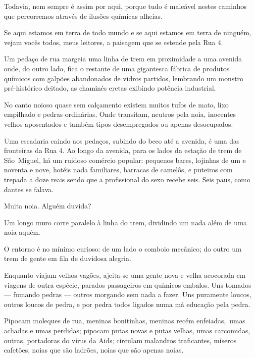 Todavia, nem sempre é assim por aqui, porque tudo é maleável nestes
caminhos que percorremos através de ilusões químicas alheias.

\asterisc{}

Se aqui estamos em terra de todo mundo e se aqui estamos em terra de
ninguém, vejam vocês todos, meus leitores, a paisagem que se estende
pela Rua 4.

Um pedaço de rua margeia uma linha de trem em proximidade a uma avenida
onde, do outro lado, fica o restante de uma gigantesca fábrica de
produtos químicos com galpões abandonados de vidros partidos, lembrando
um monstro pré-histórico deitado, as chaminés eretas exibindo potência
industrial.

No canto noioso quase sem calçamento existem muitos tufos de mato, lixo
empilhado e pedras ordinárias. Onde transitam, neutros pela noia,
inocentes velhos aposentados e também tipos desempregados ou apenas
desocupados.

Uma escadaria caindo aos pedaços, subindo do beco até a avenida, é uma
das fronteiras da Rua 4. Ao longo da avenida, para os lados da estação
de trem de São~Miguel, há um ruidoso comércio popular: pequenos bares,
lojinhas de um e noventa e nove, hotéis nada familiares, barracas de
camelôs, e puteiros com trepada a doze reais sendo que a profissional do
sexo recebe seis. Seis paus, como dantes se falava.

Muita noia. Alguém duvida?

\asterisc{}

Um longo muro corre paralelo à linha do trem, dividindo um nada além de
uma noia aquém.

O entorno é no mínimo curioso: de um lado o comboio mecânico; do outro
um trem de gente em fila de duvidosa alegria.

Enquanto viajam velhos vagões, ajeita-se uma gente nova e velha
acocorada em viagens de outra espécie, parados passageiros em químicos
embalos. Uns tomados --- fumando pedras --- outros morgando sem nada a
fazer. Uns puramente loucos, outros loucos de pedra, e por pedra todos
ligados numa má educação pela pedra.

\asterisc{}

Pipocam moleques de rua, meninas bonitinhas, meninas recém
enfeiadas,~umas achadas e umas perdidas; pipocam putas novas e putas
velhas, umas carcomidas, outras, portadoras do vírus da Aids; circulam
malandros traficantes, míseros cafetões, noias que são ladrões, noias
que são apenas noias.

